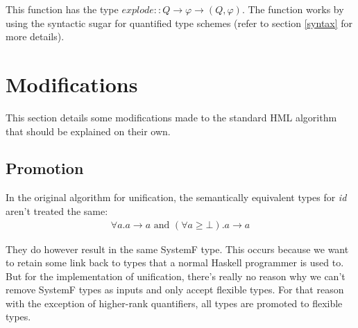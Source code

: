 \documentclass[twoside, titlepage, openright, a4paper]{book}
\renewcommand{\geq}{\geqslant}
\begin{document}
This function has the type $explode :: Q \rightarrow \varphi \rightarrow (Q, \varphi)$. The function works by using the syntactic sugar for quantified type schemes (refer to section \ref{syntax} for more details).
\section{Modifications}
This section details some modifications made to the standard HML algorithm that should be explained on their own.
\subsection{Promotion}
In the original algorithm for unification, the semantically equivalent types for \emph{id} aren't treated the same:
\begin{eqnarray*}
\forall a. a \rightarrow a \textrm{ and }
(\forall a \geq \bot). a \rightarrow a
\end{eqnarray*}

They do however result in the same SystemF type. This occurs because we want to retain some link back to types that a normal Haskell programmer is used to. But for the implementation of unification, there's really no reason why we can't remove SystemF types as inputs and only accept flexible types. For that reason with the exception of higher-rank quantifiers, all types are promoted to flexible types.
\end{document}
